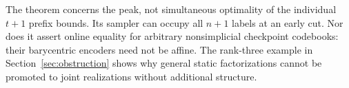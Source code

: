 The theorem concerns the peak, not simultaneous optimality of the
individual $t+1$ prefix bounds. Its sampler can occupy all $n+1$ labels
at an early cut. Nor does it assert online equality for arbitrary
nonsimplicial checkpoint codebooks: their barycentric encoders need not
be affine. The rank-three example in Section~\ref{sec:obstruction}
shows why general static factorizations cannot be promoted to joint
realizations without additional structure.
